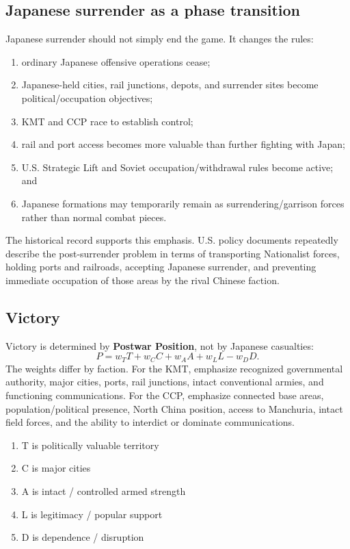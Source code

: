 \documentclass[11pt]{article}
\begin{document}
\subsection{Japanese surrender as a phase transition}
Japanese surrender should not simply end the game. It changes the rules:
\begin{enumerate}
\item ordinary Japanese offensive operations cease;
\item Japanese-held cities, rail junctions, depots, and surrender sites become political/occupation objectives;
\item KMT and CCP race to establish control;
\item rail and port access becomes more valuable than further fighting with Japan;
\item U.S. Strategic Lift and Soviet occupation/withdrawal rules become active; and
\item Japanese formations may temporarily remain as surrendering/garrison forces rather than normal combat pieces.
\end{enumerate}

The historical record supports this emphasis. U.S. policy documents repeatedly describe the post-surrender problem in terms of transporting Nationalist forces, holding ports and railroads, accepting Japanese surrender, and preventing immediate occupation of those areas by the rival Chinese faction.

\subsection{Victory}
Victory is determined by \textbf{Postwar Position}, not by Japanese casualties:
\[
P=w_T T+w_C C+w_A A+w_L L-w_D D.
\]
The weights differ by faction. For the KMT, emphasize recognized governmental authority, major cities, ports, rail junctions, intact conventional armies, and functioning communications. For the CCP, emphasize connected base areas, population/political presence, North China position, access to Manchuria, intact field forces, and the ability to interdict or dominate communications.

\begin{enumerate}
\item T is politically valuable territory
\item C is major cities
\item A is intact / controlled armed strength
\item L is legitimacy / popular support
\item D is dependence / disruption 
\end{enumerate}
\end{document}
